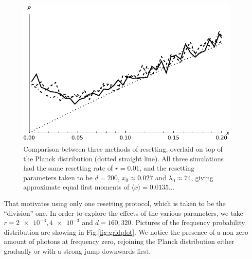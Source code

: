 \documentclass[a4paper,12pt,reqno,superscriptaddress,nofootinbib]{article}
\theoremstyle{plain}
\theoremstyle{definition}
\theoremstyle{remark}
\newcommand{\0}{^{(0)}}
\newcommand{\1}{^{(1)}}
\newcommand{\2}{^{(2)}}
\begin{document}
\begin{figure}
	\includegraphics[width=\textwidth]{spd_compare.pdf}
	\caption{Comparison between three methods of resetting, overlaid on top of the Planck distribution (dotted straight line). All three simulations had the same resetting rate of $r=0.01$, and the resetting parameters taken to be $d=200$, $x_0\approx0.027$ and $\lambda_0\approx74$, giving approximate equal first moments of $\langle x \rangle = 0.0135...$}\label{fig:compare}
\end{figure}

That motivates  using only one resetting protocol, which is taken to be the ``division'' one. In order to explore the effects of the various parameters, we take $r=\num{2e-3}, \num{4e-3}$ and $d=160,320$. Pictures of the frequency probability distribution are showing in Fig.\ref{fig:gridplot}. We notice the presence of a non-zero amount of photons at frequency zero, rejoining the Planck distribution either gradually or with a strong jump downwards first.
\end{document}
